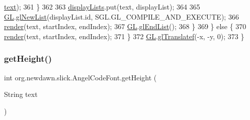 \begin{DoxyCode}
      \mbox{\hyperlink{classorg_1_1newdawn_1_1slick_1_1_angel_code_font_1_1_display_list_a046ed65c52185321ea0de11ed51154d8}{text}});
361                 \}
362                 
363                 \mbox{\hyperlink{classorg_1_1newdawn_1_1slick_1_1_angel_code_font_ad2583887204ad560daf5546b8eb6ee7d}{displayLists}}.put(text, displayList);
364 
365                 \mbox{\hyperlink{classorg_1_1newdawn_1_1slick_1_1_angel_code_font_a22c7ebf9e7aad9665c6866438b675da2}{GL}}.\mbox{\hyperlink{interfaceorg_1_1newdawn_1_1slick_1_1opengl_1_1renderer_1_1_s_g_l_a85746cd7e0de9297a821619097a5f7cc}{glNewList}}(displayList.id, SGL.GL\_COMPILE\_AND\_EXECUTE);
366                 \mbox{\hyperlink{classorg_1_1newdawn_1_1slick_1_1_angel_code_font_a9e742aa7b9ef84525a6e33bedcefd421}{render}}(text, startIndex, endIndex);
367                 \mbox{\hyperlink{classorg_1_1newdawn_1_1slick_1_1_angel_code_font_a22c7ebf9e7aad9665c6866438b675da2}{GL}}.\mbox{\hyperlink{interfaceorg_1_1newdawn_1_1slick_1_1opengl_1_1renderer_1_1_s_g_l_a300a1d9b3c984ccc0a59eb951821bf37}{glEndList}}();
368             \}
369         \} \textcolor{keywordflow}{else} \{
370             \mbox{\hyperlink{classorg_1_1newdawn_1_1slick_1_1_angel_code_font_a9e742aa7b9ef84525a6e33bedcefd421}{render}}(text, startIndex, endIndex);
371         \}
372         \mbox{\hyperlink{classorg_1_1newdawn_1_1slick_1_1_angel_code_font_a22c7ebf9e7aad9665c6866438b675da2}{GL}}.\mbox{\hyperlink{interfaceorg_1_1newdawn_1_1slick_1_1opengl_1_1renderer_1_1_s_g_l_a647aff6cabd0c83869166144e9aee833}{glTranslatef}}(-x, -y, 0);
373     \}
\end{DoxyCode}
\mbox{\label{classorg_1_1newdawn_1_1slick_1_1_angel_code_font_ad962179705beb6355e270ebc65b04b2a}} 
\subsubsection{\texorpdfstring{get\+Height()}{getHeight()}}
{\footnotesize\ttfamily int org.\+newdawn.\+slick.\+Angel\+Code\+Font.\+get\+Height (\begin{DoxyParamCaption}\item[{String}]{text }\end{DoxyParamCaption})\hspace{0.3cm}{\ttfamily [inline]}}

